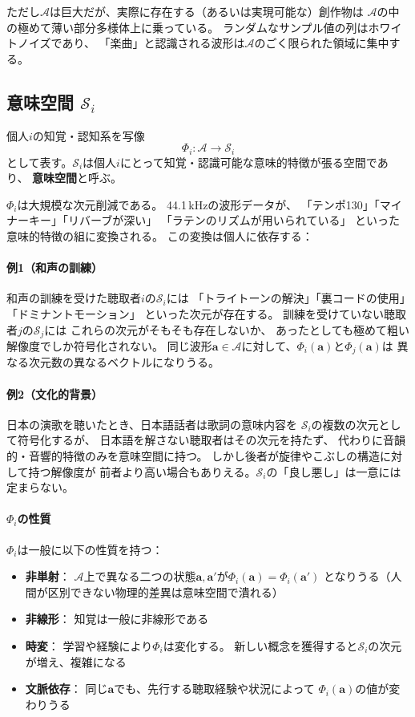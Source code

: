 \documentclass[a4paper, fontsize=10pt]{jlreq}
\newcommand{\va}{\bm{a}}
\newcommand{\A}{\mathcal{A}}
\newcommand{\Si}{\mathcal{S}_i}
\newcommand{\Sj}{\mathcal{S}_j}
\newcommand{\Phii}{\Phi_i}
\newcommand{\Phij}{\Phi_j}
\begin{document}
ただし$\A$は巨大だが、実際に存在する（あるいは実現可能な）創作物は
$\A$の中の極めて薄い部分多様体上に乗っている。
ランダムなサンプル値の列はホワイトノイズであり、
「楽曲」と認識される波形は$\A$のごく限られた領域に集中する。

\subsection{意味空間 $\Si$}

個人$i$の知覚・認知系を写像
\begin{equation}
  \Phii : \A \longrightarrow \Si
\end{equation}
として表す。$\Si$は個人$i$にとって知覚・認識可能な意味的特徴が張る空間であり、
\textbf{意味空間}と呼ぶ。

$\Phii$は大規模な次元削減である。
44.1\,kHzの波形データが、
「テンポ130」「マイナーキー」「リバーブが深い」
「ラテンのリズムが用いられている」
といった意味的特徴の組に変換される。
この変換は個人に依存する：

\paragraph{例1（和声の訓練）}
和声の訓練を受けた聴取者$i$の$\Si$には
「トライトーンの解決」「裏コードの使用」「ドミナントモーション」
といった次元が存在する。
訓練を受けていない聴取者$j$の$\Sj$には
これらの次元がそもそも存在しないか、
あったとしても極めて粗い解像度でしか符号化されない。
同じ波形$\va \in \A$に対して、$\Phii(\va)$と$\Phij(\va)$は
異なる次元数の異なるベクトルになりうる。

\paragraph{例2（文化的背景）}
日本の演歌を聴いたとき、日本語話者は歌詞の意味内容を
$\Si$の複数の次元として符号化するが、
日本語を解さない聴取者はその次元を持たず、
代わりに音韻的・音響的特徴のみを意味空間に持つ。
しかし後者が旋律やこぶしの構造に対して持つ解像度が
前者より高い場合もありえる。$\Si$の「良し悪し」は一意には定まらない。

\paragraph{$\Phii$の性質}
$\Phii$は一般に以下の性質を持つ：
\begin{itemize}[leftmargin=2em]
  \item \textbf{非単射}：
    $\A$上で異なる二つの状態$\va, \va'$が$\Phii(\va) = \Phii(\va')$
    となりうる（人間が区別できない物理的差異は意味空間で潰れる）
  \item \textbf{非線形}：
    知覚は一般に非線形である
  \item \textbf{時変}：
    学習や経験により$\Phii$は変化する。
    新しい概念を獲得すると$\Si$の次元が増え、複雑になる
  \item \textbf{文脈依存}：
    同じ$\va$でも、先行する聴取経験や状況によって
    $\Phii(\va)$の値が変わりうる
\end{itemize}
\end{document}

